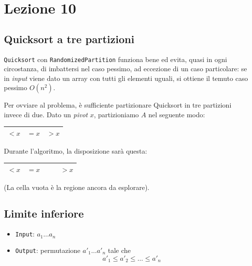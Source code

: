 \section{Lezione 10}

\subsection{Quicksort a tre partizioni}
\texttt{Quicksort} con \texttt{RandomizedPartition} funziona bene ed 
evita, quasi in ogni circostanza, di imbattersi nel caso pessimo, ad 
eccezione di un caso particolare: se in \emph{input} viene dato un 
array con tutti gli elementi uguali, si ottiene il temuto caso pessimo $O(n^2)$.\par
Per ovviare al problema, è sufficiente partizionare Quicksort in tre
partizioni invece di due. Dato un \emph{pivot} $x$, partizioniamo $A$ nel
seguente modo:

\begin{center}
    \begin{tabular}{|l|l|l|}
        \hline 
        $< x$ & $= x$ & $> x$ \\
        \hline
    \end{tabular}
\end{center}

Durante l'algoritmo, la disposizione sarà questa:

\begin{center}
    \begin{tabular}{|l|l|l|l|}
        \hline 
        $< x$ & $= x$ & $\quad$ & $> x$ \\
        \hline
    \end{tabular}
\end{center}
(La cella vuota è la regione ancora da esplorare).

 



\subsection{Limite inferiore}

\begin{itemize}[label=]
    \item \texttt{Input}: $a_1 \dots a_n$
    \item \texttt{Output}: permutazione $a'_1 \dots a'_n$ tale che
    $$a'_1 \leq a'_2 \leq \dots \leq a'_n$$
\end{itemize}

